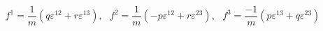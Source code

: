 \begin{equation}
f^1 =\frac{1}{m}(q\varepsilon^{12} + r \varepsilon^{13}),~~~
f^2 =  \frac{1}{m}(-p\varepsilon^{12} + r \varepsilon^{23}), ~~~
f^3 = \frac{-1}{m}( p\varepsilon^{13} + q \varepsilon^{23})
\label{n16}
\end{equation}

